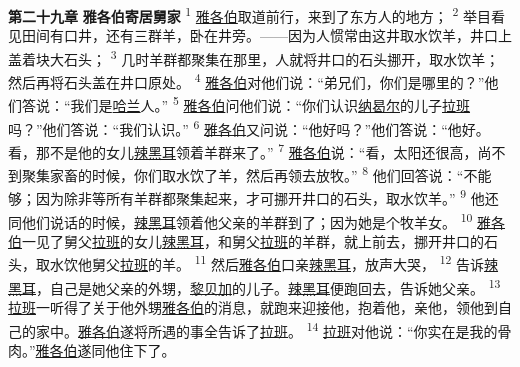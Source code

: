 \textbf{第二十九章 }
\textbf{雅各伯寄居舅家 }
\textsuperscript{1}
\uline{雅各伯}取道前行，来到了东方人的地方；
\textsuperscript{2}
举目看见田间有口井，还有三群羊，卧在井旁。——因为人惯常由这井取水饮羊，井口上盖着块大石头；
\textsuperscript{3}
几时羊群都聚集在那里，人就将井口的石头挪开，取水饮羊；然后再将石头盖在井口原处。
\textsuperscript{4}
\uline{雅各伯}对他们说：“弟兄们，你们是哪里的？”他们答说：“我们是\uline{哈兰}人。”
\textsuperscript{5}
\uline{雅各伯}问他们说：“你们认识\uline{纳曷尔}的儿子\uline{拉班}吗？”他们答说：“我们认识。”
\textsuperscript{6}
\uline{雅各伯}又问说：“他好吗？”他们答说：“他好。看，那不是他的女儿\uline{辣黑耳}领着羊群来了。”
\textsuperscript{7}
\uline{雅各伯}说：“看，太阳还很高，尚不到聚集家畜的时候，你们取水饮了羊，然后再领去放牧。”
\textsuperscript{8}
他们回答说：“不能够；因为除非等所有羊群都聚集起来，才可挪开井口的石头，取水饮羊。”
\textsuperscript{9}
他还同他们说话的时候，\uline{辣黑耳}领着他父亲的羊群到了；因为她是个牧羊女。
\textsuperscript{10}
\uline{雅各伯}一见了舅父\uline{拉班}的女儿\uline{辣黑耳}，和舅父\uline{拉班}的羊群，就上前去，挪开井口的石头，取水饮他舅父\uline{拉班}的羊。
\textsuperscript{11}
然后\uline{雅各伯}口亲\uline{辣黑耳}，放声大哭，
\textsuperscript{12}
告诉\uline{辣黑耳}，自己是她父亲的外甥，\uline{黎贝加}的儿子。\uline{辣黑耳}便跑回去，告诉她父亲。
\textsuperscript{13}
\uline{拉班}一听得了关于他外甥\uline{雅各伯}的消息，就跑来迎接他，抱着他，亲他，领他到自己的家中。\uline{雅各伯}遂将所遇的事全告诉了\uline{拉班}。
\textsuperscript{14}
\uline{拉班}对他说：“你实在是我的骨肉。”\uline{雅各伯}遂同他住下了。

